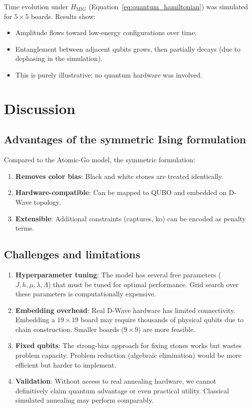 \documentclass[aps,prl,reprint]{revtex4-2}
\begin{document}
Time evolution under $H_{\text{MIG}}$ (Equation~\eqref{eq:quantum_hamiltonian}) was simulated for $5 \times 5$ boards. Results show:
\begin{itemize}
	\item Amplitude flows toward low-energy configurations over time.
	\item Entanglement between adjacent qubits grows, then partially decays (due to dephasing in the simulation).
	\item This is purely illustrative; no quantum hardware was involved.
\end{itemize}

\section{Discussion}

\subsection{Advantages of the symmetric Ising formulation}

Compared to the Atomic-Go model, the symmetric formulation:
\begin{enumerate}
	\item \textbf{Removes color bias}: Black and white stones are treated identically.
	\item \textbf{Hardware-compatible}: Can be mapped to QUBO and embedded on D-Wave topology.
	\item \textbf{Extensible}: Additional constraints (captures, ko) can be encoded as penalty terms.
\end{enumerate}

\subsection{Challenges and limitations}

\begin{enumerate}
	\item \textbf{Hyperparameter tuning}: The model has several free parameters ($J, h, \mu, \lambda, \Lambda$) that must be tuned for optimal performance. Grid search over these parameters is computationally expensive.
	
	\item \textbf{Embedding overhead}: Real D-Wave hardware has limited connectivity. Embedding a $19 \times 19$ board may require thousands of physical qubits due to chain construction. Smaller boards ($9 \times 9$) are more feasible.
	
	\item \textbf{Fixed qubits}: The strong-bias approach for fixing stones works but wastes problem capacity. Problem reduction (algebraic elimination) would be more efficient but harder to implement.
	
	\item \textbf{Validation}: Without access to real annealing hardware, we cannot definitively claim quantum advantage or even practical utility. Classical simulated annealing may perform comparably.
\end{enumerate}
\end{document}
